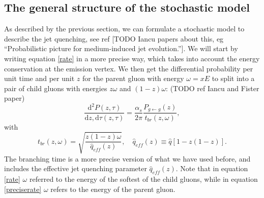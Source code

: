 \documentclass[a4paper,12pt]{article}
\numberwithin{equation}{section}
\begin{document}

\subsection{The general structure of the stochastic model}

As described by the previous section, we can formulate a stochastic model to describe the jet quenching, see ref [TODO Iancu papers about this, eg “Probabilistic picture for medium-induced jet evolution.”]. We will start by writing equation \eqref{rate} in a more precise way, which takes into account the energy conservation at the emission vertex. We then get the differential probability per unit time and per unit $z$ for the parent gluon with energy $\omega = xE$ to split into a pair of child gluons with energies $z\omega$ and $(1-z)\omega$: (TODO ref Iancu and Fister paper)
\begin{equation}\label{preciserate}
\frac{\mathrm{d}^2 P(z,\tau)}{\mathrm{d}z,\mathrm{d}\tau(z,\tau)}=\frac{\alpha_s}{2 \pi}\frac{P_{g\leftarrow g}(z)}{t_{br}(z,\omega)},
\end{equation}
with
\begin{equation}
t_{br}(z,\omega)=\sqrt{\frac{z(1-z)\omega}{\hat{q}_{eff}(z)}}, \quad \hat{q}_{eff}(z) \equiv \hat{q}[1-z(1-z)].
\end{equation}
The branching time is a more precise version of what we have used before, and includes the effective jet quenching parameter $\hat{q}_{eff}(z)$. Note that in equation \eqref{rate} $\omega$ referred to the energy of the softest of the child gluons, while in equation \eqref{preciserate} $\omega$ refers to the energy of the parent gluon.
\end{document}
